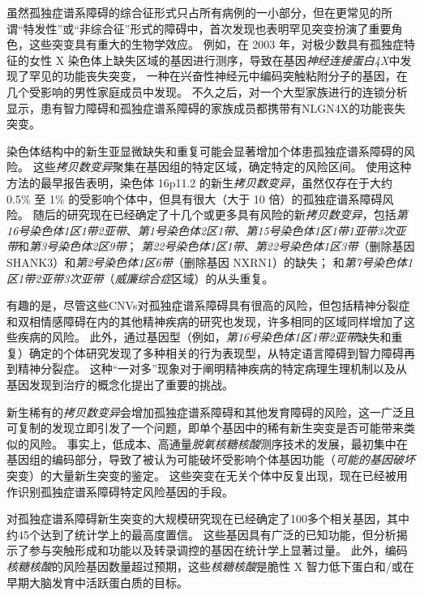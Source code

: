 虽然孤独症谱系障碍的综合征形式只占所有病例的一小部分，但在更常见的所谓“特发性”或“非综合征”形式的障碍中，首次发现也表明罕见突变扮演了重要角色，这些突变具有重大的生物学效应。
例如，在 2003 年，对极少数具有孤独症特征的女性 X 染色体上缺失区域的基因进行测序，导致在基因\textit{神经连接蛋白4X}中发现了罕见的功能丧失突变， 一种在兴奋性神经元中编码突触粘附分子的基因，在几个受影响的男性家庭成员中发现。
不久之后，对一个大型家族进行的连锁分析显示，患有智力障碍和孤独症谱系障碍的家族成员都携带有NLGN4X的功能丧失突变。


染色体结构中的新生亚显微缺失和重复可能会显著增加个体患孤独症谱系障碍的风险。
这些\textit{拷贝数变异}聚集在基因组的特定区域，确定特定的风险区间。
使用这种方法的最早报告表明，染色体 16p11.2 的新生\textit{拷贝数变异}，虽然仅存在于大约 0.5\% 至 1\% 的受影响个体中，但具有很大（大于 10 倍）的孤独症谱系障碍风险。
随后的研究现在已经确定了十几个或更多具有风险的新\textit{拷贝数变异}，包括\textit{第16号染色体1区1带2亚带}、\textit{第1号染色体2区1带}、\textit{第15号染色体1区1带1亚带3次亚带}和\textit{第3号染色体2区9带}；
\textit{第22号染色体1区1带}、\textit{第22号染色体1区3带}（删除基因 SHANK3）和\textit{第2号染色体1区6带}（删除基因 NXRN1）的缺失；
和\textit{第7号染色体1区1带2亚带3次亚带}（\textit{威廉综合症}区域）的从头重复。


有趣的是，尽管这些CNVs对孤独症谱系障碍具有很高的风险，但包括精神分裂症和双相情感障碍在内的其他精神疾病的研究也发现，许多相同的区域同样增加了这些疾病的风险。
此外，通过基因型（例如，\textit{第16号染色体1区1带2亚带}缺失和重复）确定的个体研究发现了多种相关的行为表现型，从特定语言障碍到智力障碍再到精神分裂症。
这种“一对多”现象对于阐明精神疾病的特定病理生理机制以及从基因发现到治疗的概念化提出了重要的挑战。


新生稀有的\textit{拷贝数变异}会增加孤独症谱系障碍和其他发育障碍的风险，这一广泛且可复制的发现立即引发了一个问题，即单个基因中的稀有新生突变是否可能带来类似的风险。
事实上，低成本、高通量\textit{脱氧核糖核酸}测序技术的发展，最初集中在基因组的编码部分，导致了被认为可能破坏受影响个体基因功能（\textit{可能的基因破坏}突变）的大量新生突变的鉴定。
这些突变在无关个体中反复出现，现在已经被用作识别孤独症谱系障碍特定风险基因的手段。

对孤独症谱系障碍新生突变的大规模研究现在已经确定了100多个相关基因，其中约45个达到了统计学上的最高度置信。
这些基因具有广泛的已知功能，但分析揭示了参与突触形成和功能以及转录调控的基因在统计学上显著过量。
此外，编码\textit{核糖核酸}的风险基因数量超过预期，这些\textit{核糖核酸}是脆性 X 智力低下蛋白和/或在早期大脑发育中活跃蛋白质的目标。



